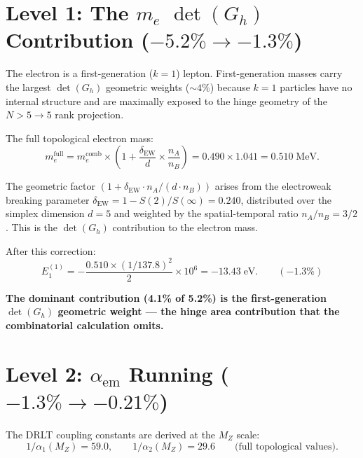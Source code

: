 \documentclass[12pt]{article}
\theoremstyle{remark}
\begin{document}
\section{Level 1: The $m_e$ $\det(G_h)$ Contribution ($-5.2\% \to -1.3\%$)}

The electron is a first-generation ($k = 1$) lepton. First-generation masses carry the largest $\det(G_h)$ geometric weights ($\sim 4\%$) because $k = 1$ particles have no internal structure and are maximally exposed to the hinge geometry of the $N > 5 \to 5$ rank projection.

The full topological electron mass:
\begin{equation}
m_e^\text{full} = m_e^\text{comb} \times \left(1 + \frac{\delta_\text{EW}}{d} \times \frac{n_A}{n_B}\right) = 0.490 \times 1.041 = 0.510\;\text{MeV}.
\end{equation}

The geometric factor $(1 + \delta_\text{EW} \cdot n_A/(d \cdot n_B))$ arises from the electroweak breaking parameter $\delta_\text{EW} = 1 - S(2)/S(\infty) = 0.240$, distributed over the simplex dimension $d = 5$ and weighted by the spatial-temporal ratio $n_A/n_B = 3/2$. This is the $\det(G_h)$ contribution to the electron mass.

After this correction:
\begin{equation}
E_1^{(1)} = -\frac{0.510 \times (1/137.8)^2}{2} \times 10^6 = -13.43\;\text{eV}. \qquad (-1.3\%)
\end{equation}

\textbf{The dominant contribution (4.1\% of 5.2\%) is the first-generation $\det(G_h)$ geometric weight --- the hinge area contribution that the combinatorial calculation omits.}

\section{Level 2: $\alpha_\text{em}$ Running ($-1.3\% \to -0.21\%$)}

The DRLT coupling constants are derived at the $M_Z$ scale:
\begin{equation}
1/\alpha_1(M_Z) = 59.0, \qquad 1/\alpha_2(M_Z) = 29.6 \qquad \text{(full topological values)}.
\end{equation}
\end{document}
